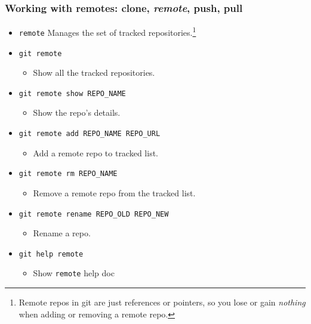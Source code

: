 \documentclass[11pt,ignorenonframetext,]{beamer}
\begin{document}
\begin{frame}[fragile]\frametitle{Working with \textbf{remotes}: clone,
\emph{remote}, push, pull}

\begin{itemize}
\item
  \texttt{remote} Manages the set of tracked repositories.\footnote{Remote
    repos in git are just references or pointers, so you lose or gain
    \emph{nothing} when adding or removing a remote repo.}
\item
  \texttt{git remote}
  \begin{itemize}
  \item
    Show all the tracked repositories.
  \end{itemize}
\item
  \texttt{git remote show REPO\_NAME}
  \begin{itemize}
  \item
    Show the repo's details.
  \end{itemize}
\item
  \texttt{git remote add REPO\_NAME REPO\_URL}
  \begin{itemize}
  \item
    Add a remote repo to tracked list.
  \end{itemize}
\item
  \texttt{git remote rm REPO\_NAME}
  \begin{itemize}
  \item
    Remove a remote repo from the tracked list.
  \end{itemize}
\item
  \texttt{git remote rename REPO\_OLD REPO\_NEW}
  \begin{itemize}
  \item
    Rename a repo.
  \end{itemize}
\item
  \texttt{git help remote}
  \begin{itemize}
     \item Show \texttt{remote} help doc
  \end{itemize}

\end{itemize}
\end{frame}
\end{document}

